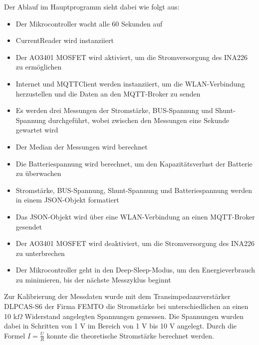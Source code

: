 \documentclass{article}
\begin{document}
Der Ablauf im Hauptprogramm sieht dabei wie folgt aus:
\begin{itemize}
    \item Der Mikrocontroller wacht alle 60 Sekunden auf 
    \item CurrentReader wird instanziiert
    \item Der AO3401 MOSFET wird aktiviert, um die Stromversorgung des INA226 zu ermöglichen
    \item Internet und MQTTClient werden instanziiert, um die WLAN-Verbindung herzustellen und die Daten an den MQTT-Broker zu senden
    \item Es werden drei Messungen der Stromstärke, BUS-Spannung und Shunt-Spannung durchgeführt, wobei zwischen den Messungen eine Sekunde gewartet wird
    \item Der Median der Messungen wird berechnet
    \item Die Batteriespannung wird berechnet, um den Kapazitätsverlust der Batterie zu überwachen
    \item Stromstärke, BUS-Spannung, Shunt-Spannung und Batteriespannung werden in einem JSON-Objekt formatiert
    \item Das JSON-Objekt wird über eine WLAN-Verbindung an einen MQTT-Broker gesendet
    \item Der AO3401 MOSFET wird deaktiviert, um die Stromversorgung des INA226 zu unterbrechen
    \item Der Mikrocontroller geht in den Deep-Sleep-Modus, um den Energieverbrauch zu minimieren, bis der nächste Messzyklus beginnt
\end{itemize}

Zur Kalibrierung der Messdaten wurde mit dem Transimpedanzverstärker DLPCAS-S6 der Firma FEMTO die Stromstärke bei unterschiedlichen an einen 
10 k\(\Omega\) Widerstand angelegten Spannungen gemessen. Die Spannungen wurden dabei in Schritten von 1 V im Bereich von 1 V bis 10 V angelegt. 
Durch die Formel \(I = \frac{U}{R}\) konnte die theoretische Stromstärke berechnet werden.
\end{document}
